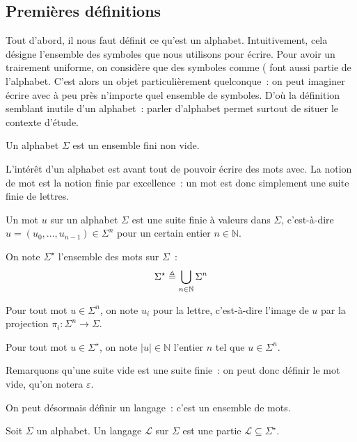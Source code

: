 \subsection{Premières définitions}

Tout d'abord, il nous faut définit ce qu'est un alphabet. Intuitivement, cela
désigne l'ensemble des symboles que nous utilisons pour écrire. Pour avoir un
trairement uniforme, on considère que des symboles comme \og ( \fg font aussi
partie de l'alphabet. C'est alors un objet particulièrement quelconque~: on peut
imaginer écrire avec à peu près n'importe quel ensemble de symboles. D'où la
définition semblant inutile d'un alphabet~: parler d'alphabet permet surtout de
situer le contexte d'étude.

\begin{definition}[Alphabet]
  Un alphabet $\Sigma$ est un ensemble fini non vide.
\end{definition}

L'intérêt d'un alphabet est avant tout de pouvoir écrire des mots avec. La
notion de mot est la notion finie par excellence~: un mot est donc simplement
une suite finie de lettres.

\begin{definition}[Mot]
  Un mot $u$ sur un alphabet $\Sigma$ est une suite finie à valeurs dans
  $\Sigma$, c'est-à-dire
  $u = (u_0,\ldots,u_{n-1})\in \Sigma^n$ pour un certain entier $n\in\mathbb N$.

  On note $\Sigma^\star$ l'ensemble des mots sur $\Sigma$~:
  \[\Sigma^\star \triangleq \bigcup_{n\in \mathbb N} \Sigma^n\]
\end{definition}

\begin{notation}
  Pour tout mot $u\in\Sigma^n$, on note $u_i$ pour la
   lettre, c'est-à-dire l'image de $u$ par la
  projection $\pi_i : \Sigma^n \to \Sigma$.

  Pour tout mot $u\in\Sigma^\star$, on note $|u|\in\mathbb N$ l'entier $n$ tel
  que $u\in \Sigma^n$.
\end{notation}

Remarquons qu'une suite vide est une suite finie~: on peut donc définir le mot
vide, qu'on notera $\varepsilon$.

On peut désormais définir un langage~: c'est un ensemble de mots.

\begin{definition}[Langage]
  Soit $\Sigma$ un alphabet. Un langage $\mathcal L$ sur $\Sigma$ est une partie
  $\mathcal L\subseteq\Sigma^\star$.
\end{definition}

